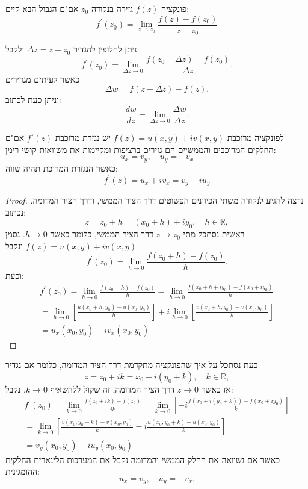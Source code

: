 \documentclass{tstextbook}
\begin{document}
\begin{definition}
פונקציה \(f(z)\) גזירה בנקודה \(z_{0}\) אם"ם הגבול הבא קיים:
$$f^{\prime}(z_{0})=\operatorname*{lim}_{z\to z_{0}}{\frac{f(z)-f(z_{0})}{z-z_{0}}}$$

\end{definition}
ניתן לחלופין להגדיר \(\Delta z=z-z_{0}\) ולקבל:
$$f^{\prime}(z_{0})=\operatorname*{lim}_{\Delta z\to0}{\frac{f(z_{0}+\Delta z)-f(z_{0})}{\Delta z}}.$$
כאשר לעיתים מגדירים
$$\Delta w=f(z+\Delta z)-f(z).$$
וניתן כעת לכתוב:
$$\frac{d w}{d z}=\operatorname*{lim}_{\Delta z\to0}\frac{\Delta w}{\Delta z}.$$

\begin{theorem}
לפונקציה מרוכבת \(f(z)=u(x,y)+iv(x,y)\) יש נגזרת מרוכבת \(f'(z)\) אם"ם החלקים המרוכבים והממשיים הם גזירים ברציפות ומקיימות את משוואות קושי רימן:
$$u_{x}=v_{y},\quad u_{y}=-v_{x}$$
כאשר הנגזרת המרוכת תהיה שווה:
$$f^{\prime}(z)=u_{x}+i v_{x}=v_{y}-i u_{y}$$

\end{theorem}
\begin{proof}
נרצה להגיע לנקודה משתי הכיוונים הפשוטים דרך הציר הממשי, ודרך הציר המדומה. נכתוב:
$$z=z_{0}+h=(x_{0}+h)+i y_{0},\quad h\in\mathbb{R},$$
ראשית נסתכל מתי \(z\to z_{0}\) דרך הציר הממשי, כלומר כאשר \(h\to 0\).
נסמן \(f(z)=u(x,y)+iv(x,y)\) ונקבל $$f^{\prime}(z_{0})=\operatorname*{lim}_{h\to0}{\frac{f(z_{0}+h)-f(z_{0})}{h}}.$$
וכעת:
$$\begin{gather}{f^{\prime}(z_{0})=\operatorname*{lim}_{h\to0}{\frac{f(z_{0}+h)-f(z_{0})}{h}}=\operatorname*{lim}_{h\to0}{\frac{f(x_{0}+h+i y_{0})-f(x_{0}+i y_{0})}{h}}}\\ {=\operatorname*{lim}_{h\to0}\left[{\frac{u\left(x_{0}+h,y_{0}\right)-u\left(x_{0},y_{0}\right)}{h}}\right]+i\operatorname*{lim}_{h\to0}\left[{\frac{v\left(x_{0}+h,y_{0}\right)-v\left(x_{0},y_{0}\right)}{h}}\right]}\\ {=u_{x}(x_{0},y_{0})+i v_{x}(x_{0},y_{0})}\end{gather}$$

\end{proof}
כעת נסתכל על איך שהפונקציה מתקדמת דרך הציר המדומה, כלומר אם נגדיר
$$z=z_{0}+i k=x_{0}+i(y_{0}+k),\quad k\in\mathbb{R},$$
אז כאשר \(z\to 0\) דרך הציר המדומה, זה שקול ללהשאיף \(k\to 0\). נקבל:
$$\begin{gather}{f^{\prime}(z_{0})=\operatorname*{lim}_{k\to0}{\frac{f(z_{0}+i k)-f(z_{0})}{i k}}=\operatorname*{lim}_{k\to0}\left[-i{\frac{f(x_{0}+i(y_{0}+k))-f(x_{0}+i y_{0})}{k}}\right]}\\ {=\operatorname*{lim}_{k\to0}\left[{\frac{v\left(x_{0},y_{0}+k\right)-v\left(x_{0},y_{0}\right)}{k}}-i{\frac{u\left(x_{0},y_{0}+k\right)-u\left(x_{0},y_{0}\right)}{k}}\right]}\\ {=v_{y}(x_{0},y_{0})-i u_{y}(x_{0},y_{0})}\end{gather}$$
כאשר אם נשוואה את החלק הממשי והמדומה נקבל את המערכות הלינארית החלקית ההומגינית:
$$u_{x}=v_{y},\quad u_{y}=-v_{x}.$$
\end{document}
